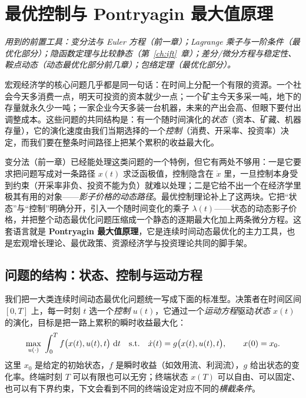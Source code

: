 \chapter{最优控制与 Pontryagin 最大值原理}
\label{ch:optcontrol}

\noindent\emph{用到的前置工具：变分法与 Euler 方程（前一章）；Lagrange 乘子与一阶条件（最优化部分）；隐函数定理与比较静态（第~\ref{ch:ift}~章）；差分/微分方程与稳定性、鞍点动态（动态最优化部分前几章）；包络定理（最优化部分）。}
\medskip

宏观经济学的核心问题几乎都是同一句话：在时间上分配一个有限的资源。一个社会今天多消费一点，明天可投资的资本就少一点；一个矿主今天多采一吨，地下的存量就永久少一吨；一家企业今天多装一台机器，未来的产出会高、但眼下要付出调整成本。这些问题的共同结构是：有一个随时间演化的\emph{状态}（资本、矿藏、机器存量），它的演化速度由我们当期选择的一个\emph{控制}（消费、开采率、投资率）决定，而我们要在整条时间路径上把某个累积的收益最大化。

变分法（前一章）已经能处理这类问题的一个特例，但它有两处不够用：一是它要求把问题写成对一条路径 $x(t)$ 求泛函极值，控制隐含在 $\dot x$ 里，一旦控制本身受到约束（开采率非负、投资不能为负）就难以处理；二是它给不出一个在经济学里极其有用的对象——\emph{影子价格的动态路径}。最优控制理论补上了这两块。它把``状态''与``控制''明确分开，引入一个随时间变化的乘子 $\lambda(t)$——状态的动态影子价格，并把整个动态最优化问题压缩成一个静态的逐期最大化加上两条微分方程。这套语言就是 \textbf{Pontryagin 最大值原理}，它是连续时间动态最优化的主力工具，也是宏观增长理论、最优政策、资源经济学与投资理论共同的脚手架。

\section{问题的结构：状态、控制与运动方程}
\label{sec:optcontrol-1}

我们把一大类连续时间动态最优化问题统一写成下面的标准型。决策者在时间区间 $[0,T]$ 上，每一时刻 $t$ 选一个\emph{控制} $u(t)$，它通过一个\emph{运动方程}驱动\emph{状态} $x(t)$ 的演化，目标是把一路上累积的瞬时收益最大化：
\[
    \max_{u(\cdot)}\;\int_0^T f\bigl(x(t),u(t),t\bigr)\,\mathop{}\!\mathrm{d} t
    \quad\text{s.t.}\quad
    \dot x(t)=g\bigl(x(t),u(t),t\bigr),\qquad x(0)=x_0 .
\]
这里 $x_0$ 是给定的初始状态，$f$ 是瞬时收益（如效用流、利润流），$g$ 给出状态的变化率。终端时刻 $T$ 可以有限也可以无穷；终端状态 $x(T)$ 可以自由、可以固定、也可以有下界约束，下文会看到不同的终端设定对应不同的\emph{横截条件}。


